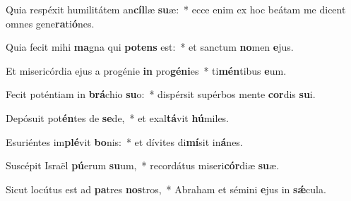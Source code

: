 \item Quia respéxit humilitátem an\textbf{cíl}læ \textbf{su}æ:~* ecce enim ex hoc beátam me dicent omnes gene\textbf{ra}ti\textbf{ó}nes.
\item Quia fecit mihi \textbf{ma}gna qui \textbf{pot}\textbf{ens} est:~* et sanctum \textbf{no}men \textbf{e}jus.
\item Et misericórdia ejus a progénie \textbf{in} pro\textbf{gé}\textbf{ni}es~* ti\textbf{mén}tibus \textbf{e}um.
\item Fecit poténtiam in \textbf{brá}chio \textbf{su}o:~* dispérsit supérbos mente \textbf{cor}dis \textbf{su}i.
\item Depósuit pot\textbf{én}tes de \textbf{se}de,~* et exal\textbf{tá}vit \textbf{hú}miles.
\item Esuriéntes im\textbf{plé}vit \textbf{bo}nis:~* et dívites di\textbf{mí}sit in\textbf{á}nes.
\item Suscépit Israël \textbf{pú}erum \textbf{su}um,~* recordátus miseri\textbf{cór}diæ \textbf{su}æ.
\item Sicut locútus est ad \textbf{pa}tres \textbf{nos}tros,~* Abraham et sémini \textbf{e}jus in \textbf{sǽ}cula.
